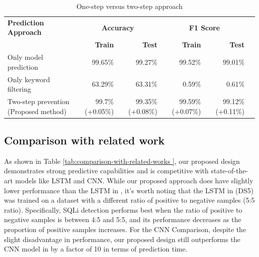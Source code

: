 \begin{table}[!htp]\centering
\caption{One-step versus two-step approach}\label{tab: one-step-vs-two-step}
\scriptsize
\begin{tabular}{lrrrrr}\toprule
\multirow{}{}{\textbf{Prediction Approach}} &\multicolumn{2}{c}{\textbf{Accuracy}} &\multicolumn{2}{c}{\textbf{F1 Score}} \\\cmidrule{2-5}
&\textbf{Train} &\textbf{Test} &\textbf{Train} &\textbf{Test} \\\midrule
Only model prediction &99.65\% &99.27\% &99.52\% &99.01\% \\
Only keyword filtering &63.29\% &63.31\% &0.59\% &0.61\% \\
Two-step prevention (Proposed method) &99.7\% (+0.05\%) &99.35\% (+0.08\%) &99.59\% (+0.07\%) &99.12\% (+0.11\%) \\
\bottomrule
\end{tabular}
\end{table}

\subsection{Comparison with related work}
\label{subsec:comparison-two-step}

\par As shown in Table \ref{tab:comparison-with-related-works }, our proposed design demonstrates strong predictive capabilities and is competitive with state-of-the-art models like LSTM and CNN. While our proposed approach does have slightly lower performance than the LSTM in \cite{8877739}, it's worth noting that the LSTM in \cite{8877739} (DS5) was trained on a dataset with a different ratio of positive to negative samples (5:5 ratio). Specifically, SQLi detection performs best when the ratio of positive to negative samples is between 4:5 and 5:5, and its performance decreases as the proportion of positive samples increases. For the CNN Comparison, despite the slight disadvantage in performance, our proposed design still outperforms the CNN model in \cite{8616823} by a factor of 10 in terms of prediction time.


